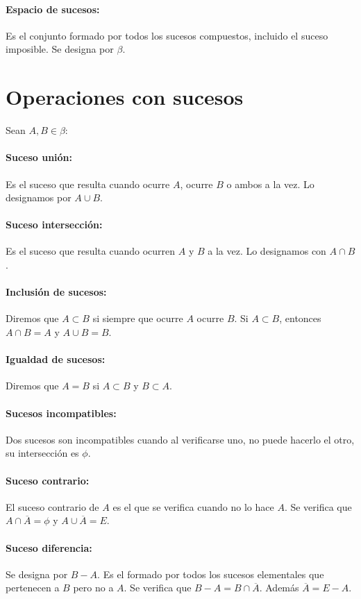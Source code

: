 \paragraph{Espacio de sucesos:}
Es el conjunto formado por todos los sucesos compuestos, incluido el suceso imposible. Se designa por $\beta$.


\section{Operaciones con sucesos}
Sean $A,B \in \beta$:
\paragraph{Suceso unión:} Es el suceso que resulta cuando ocurre $A$, ocurre $B$ o ambos a la vez. Lo designamos por $A \cup B$.
\paragraph{Suceso intersección:} Es el suceso que resulta cuando ocurren $A$ y $B$ a la vez. Lo designamos con $A \cap B$.
\paragraph{Inclusión de sucesos:} Diremos que $A \subset B$ si siempre que ocurre $A$ ocurre $B$. Si $A \subset B$, entonces $A \cap B = A$ y $A \cup B = B$.
\paragraph{Igualdad de sucesos:}Diremos que $A = B$ si $A \subset B$ y $B \subset A$.
\paragraph{Sucesos incompatibles:} Dos sucesos son incompatibles cuando al verificarse uno, no puede hacerlo el otro, su intersección es $\phi$.
\paragraph{Suceso contrario:} El suceso contrario de $A$ es el que se verifica cuando no lo hace $A$. Se verifica que $A \cap \overline{A} = \phi$ y $A \cup \overline{A} = E$.
\paragraph{Suceso diferencia:} Se designa por $B - A$. Es el formado por todos los sucesos elementales que pertenecen a $B$ pero no a $A$. Se verifica que $B - A = B \cap \overline{A}$. Además $\overline{A} = E - A$.


